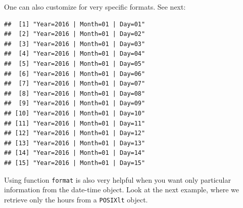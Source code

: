 \documentclass[11pt,]{book}
\newenvironment{Shaded}{\begin{snugshade}}{\end{snugshade}}
\newcommand{\KeywordTok}[1]{\textcolor[rgb]{0.27,0.27,0.27}{\textbf{#1}}}
\newcommand{\DataTypeTok}[1]{\textcolor[rgb]{0.27,0.27,0.27}{#1}}
\newcommand{\StringTok}[1]{\textcolor[rgb]{0.5,0.5,0.5}{#1}}
\newcommand{\CommentTok}[1]{\textcolor[rgb]{0.56,0.35,0.01}{\textit{#1}}}
\newcommand{\NormalTok}[1]{#1}
\begin{document}
One can also customize for very specific formats. See next:

\begin{Shaded}
\end{Shaded}

\begin{verbatim}
##  [1] "Year=2016 | Month=01 | Day=01"
##  [2] "Year=2016 | Month=01 | Day=02"
##  [3] "Year=2016 | Month=01 | Day=03"
##  [4] "Year=2016 | Month=01 | Day=04"
##  [5] "Year=2016 | Month=01 | Day=05"
##  [6] "Year=2016 | Month=01 | Day=06"
##  [7] "Year=2016 | Month=01 | Day=07"
##  [8] "Year=2016 | Month=01 | Day=08"
##  [9] "Year=2016 | Month=01 | Day=09"
## [10] "Year=2016 | Month=01 | Day=10"
## [11] "Year=2016 | Month=01 | Day=11"
## [12] "Year=2016 | Month=01 | Day=12"
## [13] "Year=2016 | Month=01 | Day=13"
## [14] "Year=2016 | Month=01 | Day=14"
## [15] "Year=2016 | Month=01 | Day=15"
\end{verbatim}

Using function \texttt{format} is also very helpful when you want only
particular information from the date-time object. Look at the next
example, where we retrieve only the hours from a \texttt{POSIXlt}
object.

\begin{Shaded}
\end{Shaded}
\end{document}
